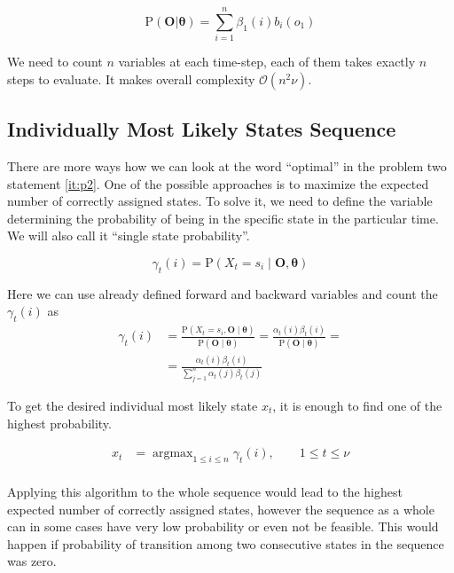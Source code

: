 \documentclass[thesis=M,english]{FITthesis}[2012/10/20]
\newcommand{\matr}[1]{\mathbf{#1}}
\newcommand{\argmax}{\mathop{\mathrm{argmax}}}
\begin{document}
\begin{equation}
\mathrm{P}(\matr{O}|\matr{\theta}) = \sum_{i=1}^n \beta_{1}(i) b_i(o_1)
\end{equation} 


We need to count $n$ variables at each time-step, each of them takes exactly $n$ steps to evaluate. It makes overall complexity $\mathcal{O}(n^2\nu)$.    

\subsection{Individually Most Likely States Sequence}\label{sec:ssp}
There are more ways how we can look at the word ``optimal'' in the problem two statement \ref{it:p2}. One of the possible approaches is to maximize the expected number of correctly assigned states. To solve it, we need to define the variable determining the probability of being in the specific state in the particular time. We will also call it ``single state probability''.

\begin{equation}
\gamma_t(i) = \mathrm{P}(X_t = s_i \mid \matr{O},\matr{\theta} ) 
\end{equation}

Here we can use already defined forward and backward variables and count the $\gamma_t(i)$ as
\begin{equation}
\begin{aligned}
\gamma_t(i) &= \frac{ \mathrm{P}( X_t = s_i, \matr{O} \mid \matr{\theta} )}{ \mathrm{P}( \matr{O} \mid \matr{\theta} )} =
               \frac{  \alpha_t(i) \beta_t(i) }{ \mathrm{P}( \matr{O} \mid \matr{\theta} )} = \\
            &= \frac{  \alpha_t(i) \beta_t(i) }{ \sum\limits_{j=1}^n \alpha_t(j) \beta_t(j) } 
\end{aligned}
\end{equation}

To get the desired individual most likely state $x_t$, it is enough to find one of the highest probability.

\begin{equation}
\begin{aligned}
x_t &= \argmax_{1 \leq i \leq n} \gamma_t(i), \qquad 1 \leq t \leq \nu \\
\end{aligned}
\end{equation} 

Applying this algorithm to the whole sequence would lead to the highest expected number of correctly assigned states, however the sequence as a whole can in some cases have very low probability or even not be feasible. This would happen if probability of transition among two consecutive states in the sequence was zero.   
   
\end{document}
